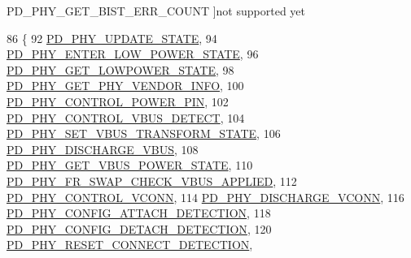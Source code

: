 \begin{Desc}
\begin{description}
{\hypertarget{group__usb__pd__phy__drv_ggab8bfca50e2ac042b47a697c88f84c3edaee3a595d1a1a42afc63594033f84a376}{P\-D\-\_\-\-P\-H\-Y\-\_\-\-G\-E\-T\-\_\-\-B\-I\-S\-T\-\_\-\-E\-R\-R\-\_\-\-C\-O\-U\-N\-T}\label{group__usb__pd__phy__drv_ggab8bfca50e2ac042b47a697c88f84c3edaee3a595d1a1a42afc63594033f84a376}
}]not supported yet \end{description}
\end{Desc}

\begin{DoxyCode}
86 \{
92     \hyperlink{group__usb__pd__phy__drv_ggab8bfca50e2ac042b47a697c88f84c3edadd7a49b2857f7cc9b4708cb899950eec}{PD\_PHY\_UPDATE\_STATE},
94     \hyperlink{group__usb__pd__phy__drv_ggab8bfca50e2ac042b47a697c88f84c3edad8bcf1fd0b1c251640924ae888b17a56}{PD\_PHY\_ENTER\_LOW\_POWER\_STATE},
96     \hyperlink{group__usb__pd__phy__drv_ggab8bfca50e2ac042b47a697c88f84c3edae2796c6a2d5cd486dd77cbc4c9b3eea7}{PD\_PHY\_GET\_LOWPOWER\_STATE},
98     \hyperlink{group__usb__pd__phy__drv_ggab8bfca50e2ac042b47a697c88f84c3eda2baeac02a0ea12619542377f471f7cc4}{PD\_PHY\_GET\_PHY\_VENDOR\_INFO},
100     \hyperlink{group__usb__pd__phy__drv_ggab8bfca50e2ac042b47a697c88f84c3edafb0f5a5d01b76353eae9108cb6bfc313}{PD\_PHY\_CONTROL\_POWER\_PIN},
102     \hyperlink{group__usb__pd__phy__drv_ggab8bfca50e2ac042b47a697c88f84c3edaf239b7319f38356c2dffdb8bda5cb873}{PD\_PHY\_CONTROL\_VBUS\_DETECT},
104     \hyperlink{group__usb__pd__phy__drv_ggab8bfca50e2ac042b47a697c88f84c3eda4b062c83b48914ee8edc74523699871d}{PD\_PHY\_SET\_VBUS\_TRANSFORM\_STATE},
106     \hyperlink{group__usb__pd__phy__drv_ggab8bfca50e2ac042b47a697c88f84c3edae705da68d4de3104b6852d84715bb71b}{PD\_PHY\_DISCHARGE\_VBUS},
108     \hyperlink{group__usb__pd__phy__drv_ggab8bfca50e2ac042b47a697c88f84c3eda4a23adc388bf03852d850ff3919328d6}{PD\_PHY\_GET\_VBUS\_POWER\_STATE},
110     \hyperlink{group__usb__pd__phy__drv_ggab8bfca50e2ac042b47a697c88f84c3eda8ceae23865e570716c3b63f07371825b}{PD\_PHY\_FR\_SWAP\_CHECK\_VBUS\_APPLIED},
112     \hyperlink{group__usb__pd__phy__drv_ggab8bfca50e2ac042b47a697c88f84c3eda68ad1faa15b73743adf7f5a58013937b}{PD\_PHY\_CONTROL\_VCONN},
114     \hyperlink{group__usb__pd__phy__drv_ggab8bfca50e2ac042b47a697c88f84c3eda7051aeb6bbd06322dceac0efdab96287}{PD\_PHY\_DISCHARGE\_VCONN},
116     \hyperlink{group__usb__pd__phy__drv_ggab8bfca50e2ac042b47a697c88f84c3eda229dbc5fbb6944903d1627a413aa76fe}{PD\_PHY\_CONFIG\_ATTACH\_DETECTION},
118     \hyperlink{group__usb__pd__phy__drv_ggab8bfca50e2ac042b47a697c88f84c3eda05e43d8ecefa1b3d13bb81cb3badf466}{PD\_PHY\_CONFIG\_DETACH\_DETECTION},
120     \hyperlink{group__usb__pd__phy__drv_ggab8bfca50e2ac042b47a697c88f84c3edaf3f42b23f0c7f36bccf50060a41b11a8}{PD\_PHY\_RESET\_CONNECT\_DETECTION},

\end{DoxyCode}
